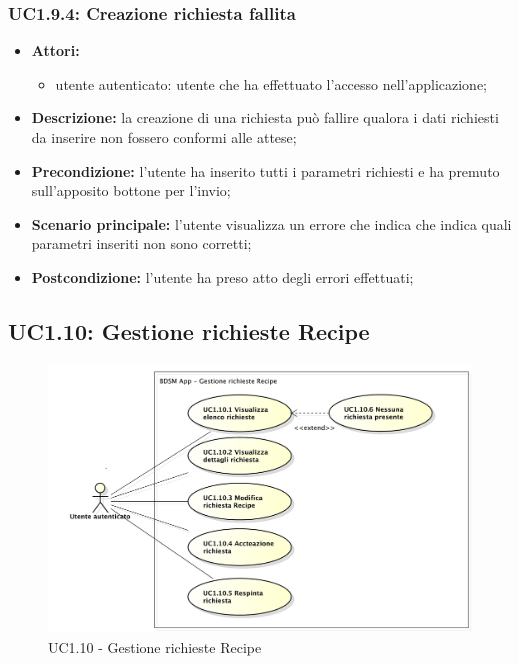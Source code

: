 \subsubsection{UC1.9.4: Creazione richiesta fallita}
\begin{itemize}
	\item \textbf{Attori:}
	\begin{itemize}
		\item utente autenticato: utente che ha effettuato l'accesso nell'applicazione;
	\end{itemize}
	\item \textbf{Descrizione:} la creazione di una richiesta può fallire qualora i dati richiesti da inserire non fossero conformi alle attese;
	\item \textbf{Precondizione:} l'utente ha inserito tutti i parametri richiesti e ha premuto sull'apposito bottone per l'invio;
	\item \textbf{Scenario principale:} l'utente visualizza un errore che indica che indica quali parametri inseriti non sono corretti;
	\item \textbf{Postcondizione:} l'utente ha preso atto degli errori effettuati;
\end{itemize}

\pagebreak


\subsection{UC1.10: Gestione richieste Recipe}
\begin{figure}[htbp]
	\centering
	\centerline{\includegraphics[scale=0.50]{./images/UC1_10.pdf}}
	\caption{UC1.10 - Gestione richieste Recipe}
\end{figure}

